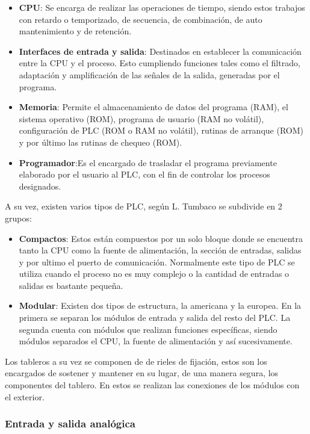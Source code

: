  \begin{itemize}
  \item \textbf{CPU}: Se encarga de realizar las operaciones de tiempo, siendo estos trabajos con retardo o temporizado, de secuencia, de combinación, de auto mantenimiento y de retención.
  \item \textbf{Interfaces de entrada y salida}:  Destinados en establecer la comunicación entre la CPU y el proceso. Esto cumpliendo funciones tales como el filtrado, adaptación y amplificación de las señales de la salida, generadas por el programa.
  \item \textbf{Memoria}: Permite el almacenamiento de datos del programa (RAM), el sistema operativo (ROM), programa de usuario (RAM no volátil), configuración de PLC (ROM o RAM no volátil), rutinas de arranque (ROM) y por último las rutinas de chequeo (ROM).
  \item \textbf{Programador}:Es el encargado de trasladar el programa previamente elaborado por el usuario al PLC, con el fin de controlar los procesos designados.
  \end{itemize}



A su vez, existen varios tipos de PLC, según L. Tumbaco \cite{tumbaco2013diseno}  se subdivide en 2 grupos:
 \begin{itemize}
  \item \textbf{Compactos}: Estos están compuestos por un solo bloque donde se encuentra tanto la CPU como la fuente de alimentación, la sección de entradas, salidas y por ultimo el puerto de comunicación. Normalmente este tipo de PLC se utiliza cuando el proceso no es muy complejo o la cantidad de entradas o salidas es bastante pequeña.
   \item \textbf{Modular}:  Existen dos tipos de estructura, la americana y la europea. En la primera se separan los módulos de entrada y salida del resto del PLC. La segunda cuenta con módulos que realizan funciones específicas, siendo módulos separados el CPU, la fuente de alimentación y así sucesivamente. 
  \end{itemize}
  
Los tableros a su vez se componen de de rieles de fijación, estos son los encargados de sostener y mantener en su lugar, de una manera segura, los componentes del tablero. En estos se realizan las conexiones de los módulos con el exterior.

\subsubsection*{Entrada y salida analógica}

